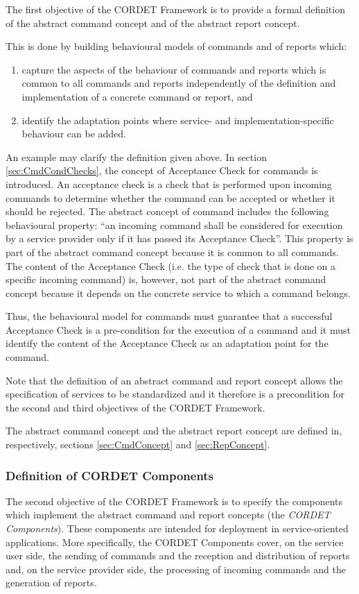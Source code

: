 \documentclass{pnp_article}
\begin{document}
The first objective of the CORDET Framework is to provide a formal definition of the abstract command concept and of the abstract report concept. 

This is done by building behavioural models of commands and of reports which:

\begin{enumerate}
\item{} capture the aspects of the behaviour of commands and reports which is common to all commands and reports independently of the definition and implementation of a concrete command or report, and
\item{} identify the adaptation points where service- and implementation-specific behaviour can be added.
\end{enumerate}

An example may clarify the definition given above. 
In section \ref{sec:CmdCondChecks}, the concept of Acceptance Check for commands is introduced. 
An acceptance check is a check that is performed upon incoming commands to determine whether the command can be accepted or whether it should be rejected. 
The abstract concept of command includes the following behavioural property: “an incoming command shall be considered for execution by a service provider only if it has passed its Acceptance Check”. 
This property is part of the abstract command concept because it is common to all commands. 
The content of the Acceptance Check (i.e. the type of check that is done on a specific incoming command) is, however, not part of the abstract command concept because it depends on the concrete service to which a command belongs.

Thus, the behavioural model for commands must guarantee that a successful Acceptance Check is a pre-condition for the execution of a command and it must identify the content of the Acceptance Check as an adaptation point for the command.

Note that the definition of an abstract command and report concept allows the specification of services to be standardized and it therefore is a precondition for the second and third objectives of the CORDET Framework. 

The abstract command concept and the abstract report concept are defined in, respectively, sections \ref{sec:CmdConcept} and \ref{sec:RepConcept}.

\subsubsection{Definition of CORDET Components}\label{sec:DefCrCmp}
The second objective of the CORDET Framework is to specify the components which implement the abstract command and report concepts (the \textit{CORDET Components}). 
These components are intended for deployment in service-oriented applications. 
More specifically, the CORDET Components cover, on the service user side, the sending of commands and the reception and distribution of reports and, on the service provider side, the processing of incoming commands and the generation of reports.
\end{document}
